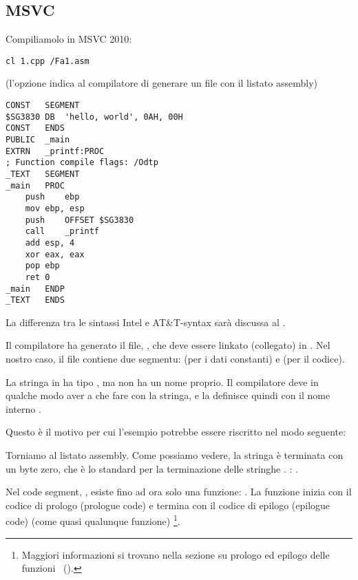 \subsection{MSVC}

Compiliamolo in MSVC 2010:

\begin{lstlisting}
cl 1.cpp /Fa1.asm
\end{lstlisting}

(l'opzione  indica al compilatore di generare un file con il listato assembly)

\begin{lstlisting}[caption=MSVC 2010]
CONST	SEGMENT
$SG3830	DB	'hello, world', 0AH, 00H
CONST	ENDS
PUBLIC	_main
EXTRN	_printf:PROC
; Function compile flags: /Odtp
_TEXT	SEGMENT
_main	PROC
	push	ebp
	mov	ebp, esp
	push	OFFSET $SG3830
	call	_printf
	add	esp, 4
	xor	eax, eax
	pop	ebp
	ret	0
_main	ENDP
_TEXT	ENDS
\end{lstlisting}

\ifx\LITE\undefined
\ITAph{}
La differenza tra le sintassi Intel e AT\&T-syntax sarà discussa al .
\fi

Il compilatore ha generato il file, , che deve essere linkato (collegato) in .
Nel nostro caso, il file contiene due segmentu:  (per i dati constanti) e  (per il codice).

\label{string_is_const_char}
La stringa  in \CCpp ha tipo \cite[p176, 7.3.2]{TCPPPL}, ma non ha un nome proprio.
Il compilatore deve in qualche modo aver a che fare con la stringa, e la definisce quindi con il nome interno .

Questo è il motivo per cui l'esempio potrebbe essere riscritto nel modo seguente:



Torniamo al listato assembly. Come possiamo vedere, la stringa è terminata con un byte zero, che è lo standard per la terminazione delle stringhe \CCpp.
\ITAph{}: .

Nel code segment, , esiste fino ad ora solo una funzione: \main{}.
La funzione \main inizia con il codice di prologo (prologue code) e termina con il codice di epilogo (epilogue code) (come quasi qualunque funzione)
\footnote{Maggiori informazioni si trovano nella sezione su prologo ed epilogo delle funzioni ~().}.

